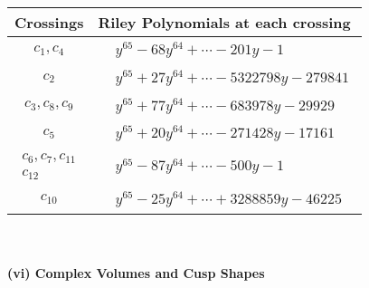 \documentclass[1p]{elsarticle_modified}
\theoremstyle{definition}
\begin{document}
\begin{tabular}{m{50pt}|m{274pt}}
Crossings & \hspace{64pt}Riley Polynomials at each crossing \\
\hline $$\begin{aligned}c_{1},c_{4}\end{aligned}$$&$\begin{aligned}
&y^{65}-68 y^{64}+\cdots-201 y-1
\end{aligned}$\\
\hline $$\begin{aligned}c_{2}\end{aligned}$$&$\begin{aligned}
&y^{65}+27 y^{64}+\cdots-5322798 y-279841
\end{aligned}$\\
\hline $$\begin{aligned}c_{3},c_{8},c_{9}\end{aligned}$$&$\begin{aligned}
&y^{65}+77 y^{64}+\cdots-683978 y-29929
\end{aligned}$\\
\hline $$\begin{aligned}c_{5}\end{aligned}$$&$\begin{aligned}
&y^{65}+20 y^{64}+\cdots-271428 y-17161
\end{aligned}$\\
\hline $$\begin{aligned}c_{6},c_{7},c_{11}\\c_{12}\end{aligned}$$&$\begin{aligned}
&y^{65}-87 y^{64}+\cdots-500 y-1
\end{aligned}$\\
\hline $$\begin{aligned}c_{10}\end{aligned}$$&$\begin{aligned}
&y^{65}-25 y^{64}+\cdots+3288859 y-46225
\end{aligned}$\\
\hline
\end{tabular}\\~\\
\newpage\flushleft \textbf{(vi) Complex Volumes and Cusp Shapes}
\end{document}
